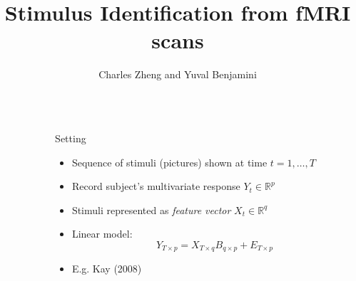 \documentclass[final]{beamer}
\title{Stimulus Identification from fMRI scans}
\author{Charles Zheng and Yuval Benjamini} %
\institute{Stanford University} %
\newlength{\sepwid}
\newlength{\onecolwid}
\begin{document}

\setlength{\belowcaptionskip}{2ex} %
\setlength\belowdisplayshortskip{2ex} %

\begin{frame}[t] %

\begin{columns}[t] %

\begin{column}{\sepwid}\end{column} %

\begin{column}{\onecolwid} %

\begin{block}{Setting}
\begin{itemize}
\item Sequence of stimuli (pictures) shown at time $t = 1,\hdots, T$
\item Record subject's multivariate response $Y_t \in \mathbb{R}^p$
\item Stimuli represented as \emph{feature vector} $X_t \in \mathbb{R}^q$
\item Linear model:
\[
Y_{T \times p} = X_{T \times q} B_{q \times p} + E_{T \times p}
\]
\item E.g. Kay (2008)
\end{itemize}


\end{block}
\end{column}
\end{columns}
\end{frame}
\end{document}
